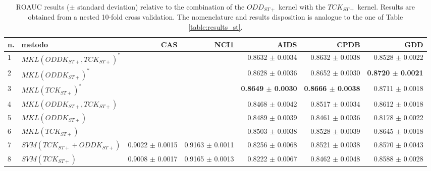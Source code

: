 \begin{landscape}
\begin{table}[ht]
        \begin{tabular}{|l|l|r|r|r|r|r|}
            \hline
            n. & metodo&CAS&NCI1&AIDS&CPDB&GDD\\
            \hline
            1& $MKL (ODDK_{ST+}, TCK_{ST+})^*$&&&0.8632 $\pm$  0.0034&0.8632 $\pm$  0.0038&0.8528 $\pm$ 0.0022\\
            2& $MKL (ODDK_{ST+})^*$&&&0.8628 $\pm$  0.0036&0.8652 $\pm$ 0.0030&\textbf{0.8720 $\pm$ 0.0021}\\
            3& $MKL (TCK_{ST+})^*$&&&\textbf{0.8649 $\pm$  0.0030}&\textbf{0.8666 $\pm$  0.0038}&0.8711 $\pm$ 0.0018 \\
            \hline
            4& $MKL (ODDK_{ST+}, TCK_{ST+})$&&&0.8468 $\pm$ 0.0042&0.8517 $\pm$ 0.0034&0.8612 $\pm$ 0.0018\\
            5& $MKL (ODDK_{ST+})$&&&0.8489 $\pm$  0.0039&0.8461 $\pm$ 0.0036&0.8178 $\pm$ 0.0022\\
            6& $MKL (TCK_{ST+})$&&&0.8503 $\pm$  0.0038&0.8528 $\pm$ 0.0039&0.8645 $\pm$ 0.0018\\
            7& $SVM (TCK_{ST+} + ODDK_{ST+})$&0.9022 $\pm$ 0.0015 &0.9163 $\pm$ 0.0011&0.8256 $\pm$ 0.0068&0.8521 $\pm$ 0.0038&0.8570 $\pm$ 0.0043\\
            8& $SVM (TCK_{ST+})$&0.9008 $\pm$ 0.0017&0.9165 $\pm$ 0.0013&0.8222 $\pm$ 0.0067&0.8462 $\pm$ 0.0048&0.8588 $\pm$ 0.0028\\
            \hline
        \end{tabular}
        \caption{ROAUC results ($\pm$ standard deviation) relative to the combination
                of the $ODD_{ST+}$ kernel with the $TCK_{ST+}$ kernel. Results are
                obtained from a nested 10-fold cross validation. The nomenclature and
            results disposition is analogue to the one of Table \ref{table:results_st}.}
        \label{table:results_stp}
    \end{table}

\end{landscape}

